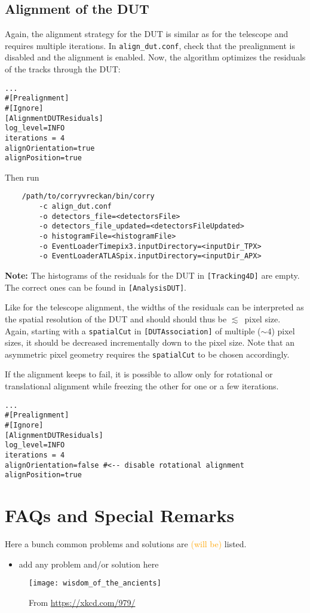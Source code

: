 \subsection*{Alignment of the DUT}
Again, the alignment strategy for the DUT is similar as for the telescope and requires multiple iterations.
In \texttt{align\_dut.conf}, check that the prealignment is disabled and the alignment is enabled.
Now, the algorithm optimizes the residuals of the tracks through the DUT:

\begin{verbatim}
...
#[Prealignment]
#[Ignore]
[AlignmentDUTResiduals]
log_level=INFO
iterations = 4
alignOrientation=true
alignPosition=true
\end{verbatim}

Then run
\begin{verbatim}
    /path/to/corryvreckan/bin/corry 
    	-c align_dut.conf 
    	-o detectors_file=<detectorsFile> 
    	-o detectors_file_updated=<detectorsFileUpdated> 
    	-o histogramFile=<histogramFile> 
    	-o EventLoaderTimepix3.inputDirectory=<inputDir_TPX>
    	-o EventLoaderATLASpix.inputDirectory=<inputDir_APX>
\end{verbatim}

\textbf{Note:} The histograms of the residuals for the DUT in \texttt{[Tracking4D]} are empty. The correct ones can be found in \texttt{[AnalysisDUT]}.

Like for the telescope alignment, the widths of the residuals can be interpreted as the spatial resolution of the DUT and should should thus be $\lesssim$~pixel size.
Again, starting with a \texttt{spatialCut} in \texttt{[DUTAssociation]} of multiple ($\sim4$) pixel sizes, it should be decreased incrementally down to the pixel size. Note that an asymmetric pixel geometry requires the \texttt{spatialCut} to be chosen accordingly.

If the alignment keeps to fail, it is possible to allow only for rotational or translational alignment while freezing the other for one or a few iterations.

\begin{verbatim}
...
#[Prealignment]
#[Ignore]
[AlignmentDUTResiduals]
log_level=INFO
iterations = 4
alignOrientation=false #<-- disable rotational alignment
alignPosition=true
\end{verbatim}

\section{FAQs and Special Remarks}
Here a bunch common problems and solutions are \textcolor{orange}{(will be)} listed.
\begin{itemize}
\item add any problem and/or solution here
\end{itemize}

\vspace{3cm}
\begin{figure}[h]
	\centering
	\texttt{[image: wisdom\_of\_the\_ancients]}
	\caption{From \url{https://xkcd.com/979/}}
	\label{fig:wisdom}
\end{figure}
